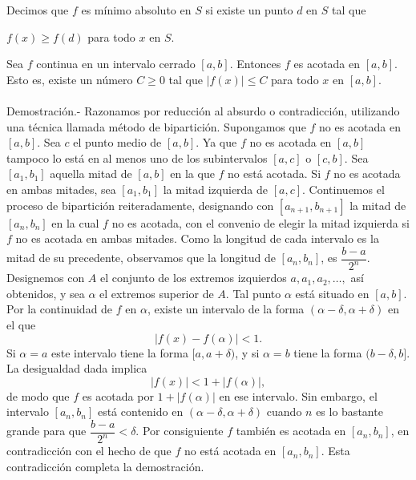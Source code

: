     \begin{def.}
	Decimos que $f$ es mínimo absoluto en $S$ si existe un punto $d$ en $S$ tal que
	\begin{center}
	    $f(x)\geq f(d)$ para todo $x$ en $S$.
	\end{center}
    \end{def.}

\begin{teo}
    Sea $f$ continua en un intervalo cerrado $[a,b]$. Entonces $f$ es acotada en $[a,b]$. Esto es, existe un número $C\geq 0$ tal que $|f(x)|\leq C$ para todo $x$ en $[a,b]$.\\\\
	Demostración.-\; Razonamos por reducción al absurdo o contradicción, utilizando una técnica llamada método de bipartición. Supongamos que $f$ no es acotada en $[a,b]$. Sea $c$ el punto medio de $[a,b]$. Ya que $f$ no es acotada en $[a,b]$ tampoco lo está en al menos uno de los subintervalos $[a,c]$ o $[c,b]$. Sea $[a_1,b_1]$ aquella mitad de $[a,b]$ en la que $f$ no está acotada. Si $f$ no es acotada en ambas mitades, sea $[a_1,b_1]$ la mitad izquierda de $[a,c]$. Continuemos el proceso de bipartición reiteradamente, designando con $[a_{n+1},b_{n+1}]$ la mitad de $[a_n,b_n]$ en la cual $f$ no es acotada, con el convenio de elegir la mitad izquierda si $f$ no es acotada en ambas mitades. Como la longitud de cada intervalo es la mitad de su precedente, observamos que la longitud de $[a_n,b_n]$, es $\dfrac{b-a}{2^n}$.\\
	Designemos con $A$ el conjunto de los extremos izquierdos $a,a_1,a_2,\ldots,$ así obtenidos, y sea $\alpha$ el extremos superior de $A$. Tal punto $\alpha$ está situado en $[a,b]$. Por la continuidad de $f$ en $\alpha$, existe un intervalo de la forma $(\alpha-\delta,\alpha+\delta)$ en el que 
	$$|f(x)-f(\alpha)|<1.$$
	Si $\alpha=a$ este intervalo tiene la forma $[a,a+\delta)$, y si $\alpha=b$ tiene la forma $(b-\delta,b]$. La desigualdad dada implica
	$$|f(x)|<1+|f(\alpha)|,$$
	de modo que $f$ es acotada por $1+|f(\alpha)|$ en ese intervalo. Sin embargo, el intervalo $[a_n,b_n]$ está contenido en $(\alpha-\delta,\alpha+\delta)$ cuando $n$ es lo bastante grande para que $\dfrac{b-a}{2^n}<\delta$. Por consiguiente $f$ también es acotada en $[a_n,b_n]$, en contradicción con el hecho de que $f$ no está acotada en $[a_n,b_n]$. Esta contradicción completa la demostración.\\\\
\end{teo}

